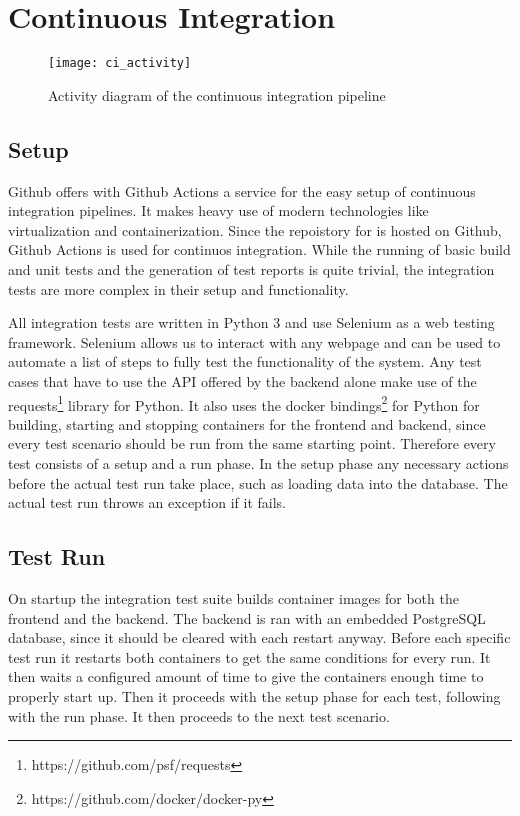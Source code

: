 \section{Continuous Integration}

\begin{figure}[h]
	\texttt{[image: ci\_activity]}
  \caption{Activity diagram of the continuous integration pipeline}
	\centering

\end{figure}

\subsection{Setup}
Github offers with Github Actions a service for the easy setup of continuous integration pipelines. It makes heavy use of modern technologies like virtualization and containerization. Since the repoistory for \parkview{} is hosted on Github, Github Actions is used for continuos integration. While the running of basic build and unit tests and the generation of test reports is quite trivial, the integration tests are more complex in their setup and functionality.

All integration tests are written in Python 3 and use Selenium as a web testing framework. Selenium allows us to interact with any webpage and can be used to automate a list of steps to fully test the functionality of the system. Any test cases that have to use the API offered by the backend alone make use of the requests\footnote{https://github.com/psf/requests} library for Python. It also uses the docker bindings\footnote{https://github.com/docker/docker-py} for Python for building, starting and stopping containers for the frontend and backend, since every test scenario should be run from the same starting point. Therefore every test consists of a setup and a run phase. In the setup phase any necessary actions before the actual test run take place, such as loading data into the database. The actual test run throws an exception if it fails.

\subsection{Test Run}
On startup the integration test suite builds container images for both the frontend and the backend. The backend is ran with an embedded PostgreSQL database, since it should be cleared with each restart anyway. Before each specific test run it restarts both containers to get the same conditions for every run. It then waits a configured amount of time to give the containers enough time to properly start up. Then it proceeds with the setup phase for each test, following with the run phase. It then proceeds to the next test scenario.

